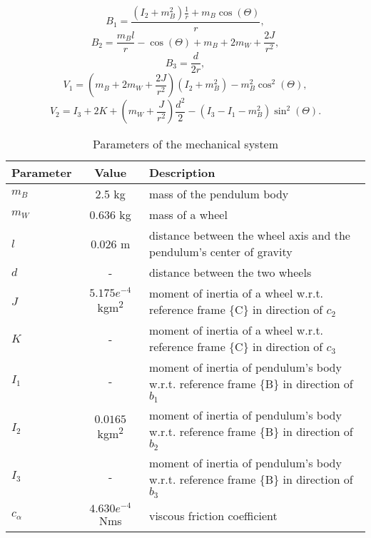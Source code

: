 \begin{equation}
	B_{1} = \frac{(I_2 + m_B^2) \frac{1}{r} + m_B \cos(\Theta)}{r},
\end{equation}
\begin{equation}
	B_{2} = \frac{m_B l}{r} - \cos(\Theta) + m_B + 2m_W + \frac{2J}{r^2},
\end{equation}
\begin{equation}
	B_{3} = \frac{d}{2r},
\end{equation}
\begin{equation}
	V_{1} = (m_B + 2m_W + \frac{2J}{r^2}) (I_2 + m_B^2) - m_B^2 \cos^2(\Theta),
\end{equation}
\begin{equation}
	V_{2} = I_3 + 2K + (m_W + \frac{J}{r^2}) \frac{d^2}{2} - (I_3 - I_1 - m_B^2) \sin^2(\Theta).
\end{equation}

	
\begin{table}[h!]
	\centering
	\caption{Parameters of the mechanical system}
	\label{tab:parameters}
	\begin{tabular}{lcl}
		\toprule
		Parameter & Value & Description \\
		\midrule
		$m_B$ & 2.5 kg & mass of the pendulum body \\
		$m_W$ & 0.636 kg & mass of a wheel \\
		$l$ & 0.026 m & distance between the wheel axis and the pendulum's center of gravity \\
		$d$ & - & distance between the two wheels \\
		$J$ & \(5.175 e^{-4}\) kgm\textsuperscript{2} & moment of inertia of a wheel w.r.t. reference frame \{C\} in direction of \(c_2\) \\
		$K$ & - & moment of inertia of a wheel w.r.t. reference frame \{C\} in direction of \(c_3\) \\
		$I_1$ & - & moment of inertia of pendulum's body w.r.t. reference frame \{B\} in direction of \(b_1\) \\
		$I_2$ & \(0.0165\) kgm\textsuperscript{2} & moment of inertia of pendulum's body w.r.t. reference frame \{B\} in direction of \(b_2\) \\
		$I_3$ & - & moment of inertia of pendulum's body w.r.t. reference frame \{B\} in direction of \(b_3\) \\
		$c_\alpha$ & \(4.630 e^{-4}\) Nms & viscous friction coefficient \\
		\bottomrule
	\end{tabular}
\end{table}
	


